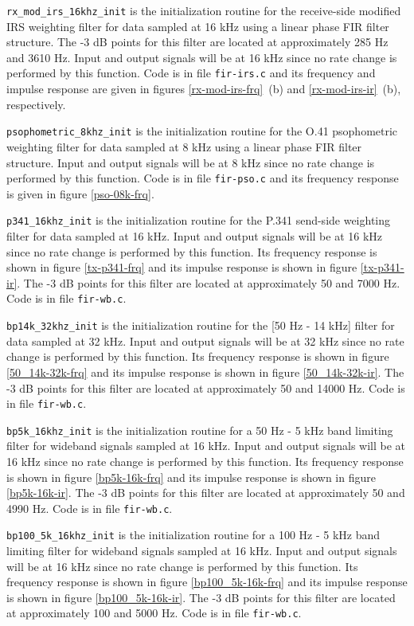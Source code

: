 {\tt rx\_mod\_irs\_16khz\_init} is the initialization routine for the
receive-side modified IRS weighting filter for data sampled at 16 kHz
using a linear phase FIR filter structure. The -3 dB points for this
filter are located at approximately 285 Hz and 3610 Hz. Input and
output signals will be at 16 kHz since no rate change is performed by
this function. Code is in file {\tt fir-irs.c} and its frequency and
impulse response are given in figures \ref{rx-mod-irs-frq}~(b) and
\ref{rx-mod-irs-ir}~(b), respectively.

{\tt psophometric\_8khz\_init} is the initialization routine for the
O.41 psophometric weighting filter for data sampled at 8 kHz using a
linear phase FIR filter structure. Input and output signals will be at
8 kHz since no rate change is performed by this function. Code is in
file {\tt fir-pso.c} and its frequency response is given in figure
\ref{pso-08k-frq}.

{\tt p341\_16khz\_init} is the initialization routine for the P.341
send-side weighting filter for data sampled at 16 kHz. Input and
output signals will be at 16 kHz since no rate change is performed by
this function. Its frequency response is shown in figure
\ref{tx-p341-frq} and its impulse response is shown in figure
\ref{tx-p341-ir}. The -3 dB points for this filter are located at
approximately 50 and 7000 Hz. Code is in file {\tt fir-wb.c}.

{\tt bp14k\_32khz\_init} is the initialization routine for the
[50 Hz - 14 kHz] filter for data sampled at 32 kHz. Input and output
signals will be at 32 kHz since no rate change is performed by
this function. Its frequency response is shown in figure
\ref{50_14k-32k-frq} and its impulse response is shown in figure
\ref{50_14k-32k-ir}. The -3 dB points for this filter are located
at approximately 50 and 14000 Hz. Code is in file {\tt fir-wb.c}.

{\tt bp5k\_16khz\_init} is the initialization routine for a 
50 Hz - 5 kHz band limiting filter for wideband signals sampled at 16
kHz. Input and output signals will be at 16 kHz since no rate
change is performed by this function. Its frequency response is
shown in figure \ref{bp5k-16k-frq} and its impulse response is
shown in figure \ref{bp5k-16k-ir}. The -3 dB points for this
filter are located at approximately 50 and 4990 Hz. Code is in
file {\tt fir-wb.c}.

{\tt bp100\_5k\_16khz\_init} is the initialization routine for a
 100 Hz - 5 kHz band limiting filter for wideband signals sampled at 16
kHz. Input and output signals will be at 16 kHz since no rate
change is performed by this function. Its frequency response is
shown in figure \ref{bp100_5k-16k-frq} and its impulse response is
shown in figure \ref{bp100_5k-16k-ir}. The -3 dB points for this
filter are located at approximately 100 and 5000 Hz. Code is in
file {\tt fir-wb.c}.

